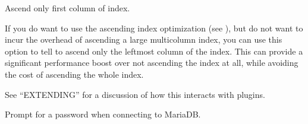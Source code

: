\documentclass[letterpaper,10pt,english]{sphinxmanual}
\begin{document}

\begin{fulllineitems}
\label{\detokenize{mariadb-archiver:cmdoption-mariadb-archiver-ascend-first}}
\sphinxAtStartPar
Ascend only first column of index.

\sphinxAtStartPar
If you do want to use the ascending index optimization (see {\hyperref[\detokenize{mariadb-archiver:cmdoption-mariadb-archiver-no-ascend}]{}}),
but do not want to incur the overhead of ascending a large multi\sphinxhyphen{}column index,
you can use this option to tell  to ascend only the leftmost column
of the index.  This can provide a significant performance boost over not
ascending the index at all, while avoiding the cost of ascending the whole
index.

\sphinxAtStartPar
See “EXTENDING” for a discussion of how this interacts with plugins.

\end{fulllineitems}


\begin{fulllineitems}
\label{\detokenize{mariadb-archiver:cmdoption-mariadb-archiver-ask-pass}}
\sphinxAtStartPar
Prompt for a password when connecting to MariaDB.

\end{fulllineitems}
\end{document}
